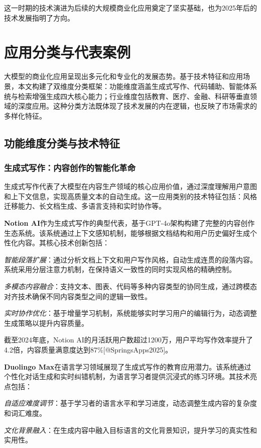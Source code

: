 \documentclass{article}
\begin{document}
这一时期的技术演进为后续的大规模商业化应用奠定了坚实基础，也为2025年后的技术发展指明了方向。

\section{应用分类与代表案例}
大模型的商业化应用呈现出多元化和专业化的发展态势。基于技术特征和应用场景，本文构建了双维度分类框架：功能维度涵盖生成式写作、代码辅助、智能体系统与检索增强生成四大核心能力；行业维度包括教育、医疗、金融、科研等垂直领域的深度应用。这种分类方法既体现了技术发展的内在逻辑，也反映了市场需求的多样化特征。

\subsection{功能维度分类与技术特征}

\subsubsection{生成式写作：内容创作的智能化革命}
生成式写作代表了大模型在内容生产领域的核心应用价值，通过深度理解用户意图和上下文信息，实现高质量文本的自动生成。这一应用类别的技术特征包括：风格迁移能力、长文档生成、多语言支持和实时协作等。

\textbf{Notion AI}作为生成式写作的典型代表，基于GPT-4o架构构建了完整的内容创作生态系统。该系统通过上下文感知机制，能够根据文档结构和用户历史偏好生成个性化内容。其核心技术创新包括：

\textit{智能段落扩展}：通过分析文档上下文和用户写作风格，自动生成连贯的段落内容。系统采用分层注意力机制，在保持语义一致性的同时实现风格的精确控制。

\textit{多模态内容融合}：支持文本、图表、代码等多种内容类型的协同生成，通过跨模态对齐技术确保不同内容类型之间的逻辑一致性。

\textit{实时协作优化}：基于增量学习机制，系统能够实时学习用户的编辑行为，动态调整生成策略以提升内容质量。

截至2024年底，Notion AI的月活跃用户数超过1200万，用户平均写作效率提升了4.2倍，内容质量满意度达到87\%[@SpringsApps2025]。

\textbf{Duolingo Max}在语言学习领域展现了生成式写作的教育应用潜力。该系统通过个性化对话生成和实时纠错机制，为语言学习者提供沉浸式的练习环境。其技术亮点包括：

\textit{自适应难度调节}：基于学习者的语言水平和学习进度，动态调整生成内容的复杂度和词汇难度。

\textit{文化背景融入}：在生成内容中融入目标语言的文化背景知识，提升学习的真实性和实用性。
\end{document}
